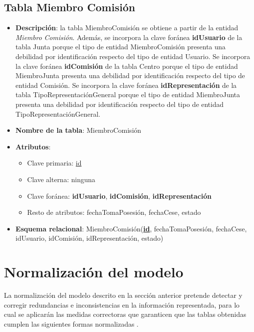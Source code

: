 \subsection{Tabla Miembro Comisión}
    \begin{itemize}
        \item \textbf{Descripción}: la tabla MiembroComisión se obtiene a partir de la entidad \textit{Miembro Comisión}. Además, se incorpora la clave foránea \textbf{idUsuario} de la tabla Junta porque el tipo de entidad MiembroComisión presenta una debilidad por identificación respecto del tipo de entidad Usuario. Se incorpora la clave foránea \textbf{idComisión} de la tabla Centro porque el tipo de entidad MiembroJunta presenta una debilidad por identificación respecto del tipo de entidad Comisión. Se incorpora la clave foránea \textbf{idRepresentación} de la tabla TipoRepresentaciónGeneral porque el tipo de entidad MiembroJunta presenta una debilidad por identificación respecto del tipo de entidad TipoRepresentaciónGeneral.
        \item \textbf{Nombre de la tabla}: MiembroComisión
        \item \textbf{Atributos}:
            \begin{itemize}
                \item Clave primaria: \underline{id}
                \item Clave alterna: ninguna
                \item Clave foránea: \textbf{idUsuario}, \textbf{idComisión}, \textbf{idRepresentación}
                \item Resto de atributos: fechaTomaPosesión, fechaCese, estado
            \end{itemize}
        \item \textbf{Esquema relacional}: 
            MiembroComisión(\textbf{\underline{id}}, fechaTomaPosesión, fechaCese, idUsuario, idComisión, idRepresentación, estado)
    \end{itemize}
    
 \section{Normalización del modelo}\label{sec:normalizacion}
La normalización del modelo descrito en la sección anterior pretende detectar y corregir redundancias e inconsistencias en la información representada, para lo cual se aplicarán las medidas correctoras que garanticen que las tablas obtenidas cumplen las siguientes formas normalizadas \cite{reglasBD}.

